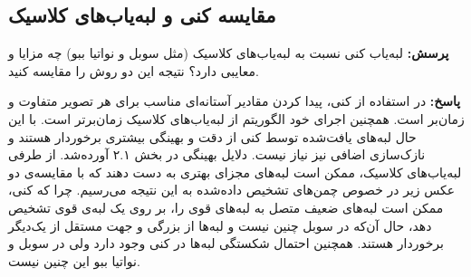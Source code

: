 \documentclass[12pt,a4paper]{article}
\theoremstyle{definition}
\theoremstyle{theorem}
\theoremstyle{definition}
\begin{document}
\vspace{0.2cm}
\begin{center}
\end{center}

\vspace{0.5cm}
\subsection{مقایسه کنی و لبه‌یاب‌های کلاسیک}
\textbf{پرسش: }
لبه‌یاب کنی نسبت به لبه‌یاب‌های کلاسیک (مثل سوبل و نواتیا ببو) چه مزایا و معایبی دارد؟ نتیجه این دو روش را مقایسه کنید.

\textbf{پاسخ: }
در استفاده‌ از کنی، پیدا کردن مقادیر آستانه‌‌ای مناسب برای هر تصویر متفاوت و زمان‌بر است. همچنین اجرای خود الگوریتم از لبه‌یاب‌های کلاسیک زمان‌برتر است. با این حال لبه‌های یافت‌شده توسط کنی از دقت و بهینگی بیشتری برخوردار هستند و نازک‌سازی اضافی نیز نیاز نیست. دلایل بهینگی در بخش ۲.۱ آورده‌شد. 
از طرفی لبه‌یاب‌های کلاسیک، ممکن است لبه‌های مجزای بهتری به دست دهند که با مقایسه‌ی دو عکس زیر در خصوص چمن‌های تشخیص داده‌شده به این نتیجه می‌رسیم. چرا که کنی، ممکن است لبه‌های ضعیف متصل به لبه‌های قوی را، بر روی یک لبه‌ی قوی تشخیص دهد، حال آن‌که در سوبل چنین نیست و لبه‌ها از بزرگی و جهت مستقل از یک‌دیگر برخوردار هستند.
همچنین احتمال شکستگی لبه‌ها در کنی وجود دارد ولی در سوبل و نواتیا ببو این چنین نیست.
\end{document}
